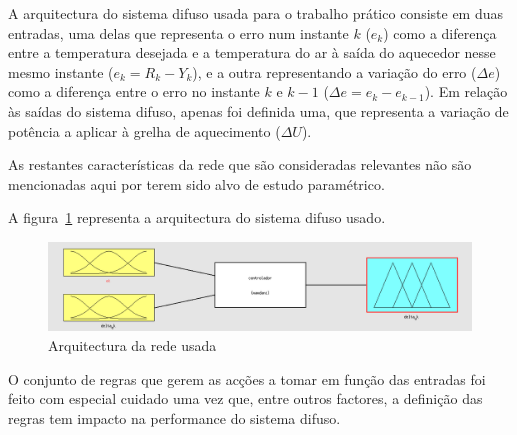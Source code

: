 \documentclass{article}
\begin{document}
A arquitectura do sistema difuso usada para o trabalho prático consiste em duas entradas, uma delas que representa o erro num instante $k$ ($e_{k}$) como a diferença entre a temperatura desejada e a temperatura do ar à saída do aquecedor nesse mesmo instante ($e_{k} = R_{k} - Y_{k}$), e a outra representando a variação do erro ($\Delta e$) como a diferença entre o erro no instante $k$ e $k-1$ ($\Delta e=e_{k}-e_{k-1}$). Em relação às saídas do sistema difuso, apenas foi definida uma, que representa a variação de potência a aplicar à grelha de aquecimento ($\Delta U$).

As restantes características da rede que são consideradas relevantes não são mencionadas aqui por terem sido alvo de estudo paramétrico.

A figura~\ref{nn_architecture} representa a arquitectura do sistema difuso usado.

\begin{figure}[!h]
  \centering
  \includegraphics[width=5in]{figures/nn_architecture}
  \caption{Arquitectura da rede usada}
  \label{nn_architecture}
\end{figure}

O conjunto de regras que gerem as acções a tomar em função das entradas foi feito com especial cuidado uma vez que, entre outros factores, a definição das regras tem impacto na performance do sistema difuso.
\end{document}
